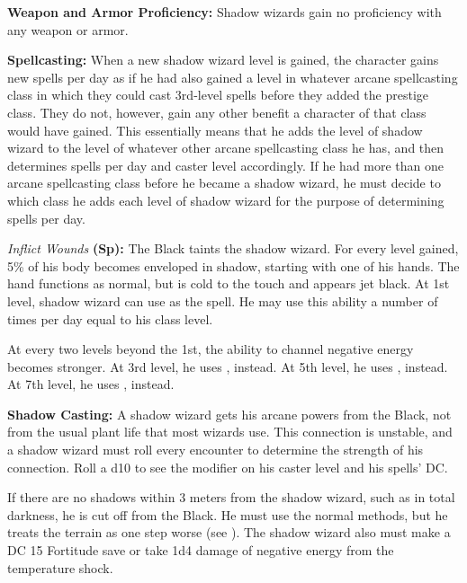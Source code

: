 {
\textbf{Weapon and Armor Proficiency:} Shadow wizards gain no proficiency with any weapon or armor.

\textbf{Spellcasting:} When a new shadow wizard level is gained, the character gains new spells per day as if he had also gained a level in whatever arcane spellcasting class in which they could cast 3rd-level spells before they added the prestige class. They do not, however, gain any other benefit a character of that class would have gained. This essentially means that he adds the level of shadow wizard to the level of whatever other arcane spellcasting class he has, and then determines spells per day and caster level accordingly. If he had more than one arcane spellcasting class before he became a shadow wizard, he must decide to which class he adds each level of shadow wizard for the purpose of determining spells per day.

\textit{Inflict Wounds} \textbf{(Sp):} The Black taints the shadow wizard. For every level gained, 5\% of his body becomes enveloped in shadow, starting with one of his hands. The hand functions as normal, but is cold to the touch and appears jet black. At 1st level, shadow wizard can use  as the spell. He may use this ability a number of times per day equal to his class level.

At every two levels beyond the 1st, the ability to channel negative energy becomes stronger. At 3rd level, he uses , instead. At 5th level, he uses , instead. At 7th level, he uses , instead.

\textbf{Shadow Casting:} A shadow wizard gets his arcane powers from the Black, not from the usual plant life that most wizards use. This connection is unstable, and a shadow wizard must roll every encounter to determine the strength of his connection. Roll a d10 to see the modifier on his caster level and his spells' DC.

If there are no shadows within 3 meters from the shadow wizard, such as in total darkness, he is cut off from the Black. He must use the normal methods, but he treats the terrain as one step worse (see ). The shadow wizard also must make a DC 15 Fortitude save or take 1d4 damage of negative energy from the temperature shock.


}

